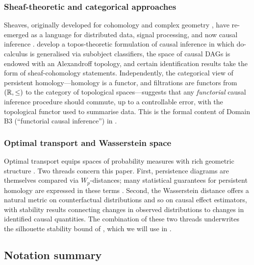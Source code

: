 \subsubsection{Sheaf-theoretic and categorical approaches}

Sheaves, originally developed for cohomology and complex geometry
\citep{bredon1997sheaf}, have re-emerged as a language for distributed
data, signal processing, and now causal inference
\citep{robinson2014topological,curry2014sheaves,spivak2014category}.
\citet{mahadevan2021causal,mahadevan2022universal,mahadevan2025sheaf}
develop a topos-theoretic formulation of causal inference in which
do-calculus is generalised via subobject classifiers, the space of causal
DAGs is endowed with an Alexandroff topology, and certain identification
results take the form of sheaf-cohomology statements. Independently, the
categorical view of persistent homology---homology is a functor, and
filtrations are functors from $(\mathbb{R}, \le)$ to the category of topological
spaces---suggests that any \emph{functorial} causal inference procedure
should commute, up to a controllable error, with the topological functor
used to summarise data. This is the formal content of Domain B3
(``functorial causal inference'') in .

\subsubsection{Optimal transport and Wasserstein space}

Optimal transport equips spaces of probability measures with rich
geometric structure
\citep{villani2009optimal,peyre2019computational}. Two threads concern
this paper. First, persistence diagrams are themselves compared via
$W_p$-distances; many statistical guarantees for persistent homology are
expressed in these terms
\citep{mileyko2011probability,turner2014frechet,
chazal2014stochastic}. Second, the Wasserstein distance offers a natural
metric on counterfactual distributions and so on causal effect
estimators, with stability results connecting changes in observed
distributions to changes in identified causal quantities. The combination
of these two threads underwrites the silhouette stability bound of
\citet{kim2026topological}, which we will use in
.

\subsection{Notation summary}
\label{sec:notation}

